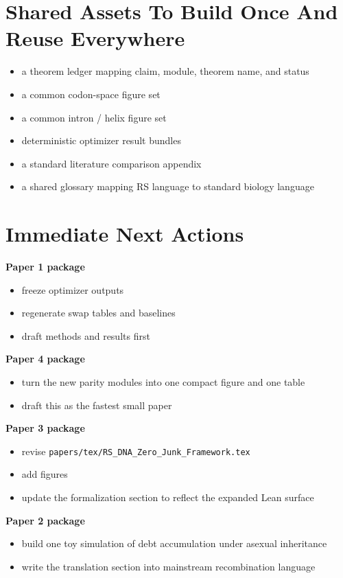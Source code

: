 \documentclass[11pt]{article}
\begin{document}
\section*{Shared Assets To Build Once And Reuse Everywhere}
\begin{itemize}
\item a theorem ledger mapping claim, module, theorem name, and status
\item a common codon-space figure set
\item a common intron / helix figure set
\item deterministic optimizer result bundles
\item a standard literature comparison appendix
\item a shared glossary mapping RS language to standard biology language
\end{itemize}

\section*{Immediate Next Actions}
\textbf{Paper 1 package}
\begin{itemize}
\item freeze optimizer outputs
\item regenerate swap tables and baselines
\item draft methods and results first
\end{itemize}

\textbf{Paper 4 package}
\begin{itemize}
\item turn the new parity modules into one compact figure and one table
\item draft this as the fastest small paper
\end{itemize}

\textbf{Paper 3 package}
\begin{itemize}
\item revise \texttt{papers/tex/RS\_DNA\_Zero\_Junk\_Framework.tex}
\item add figures
\item update the formalization section to reflect the expanded Lean surface
\end{itemize}

\textbf{Paper 2 package}
\begin{itemize}
\item build one toy simulation of debt accumulation under asexual inheritance
\item write the translation section into mainstream recombination language
\end{itemize}
\end{document}
